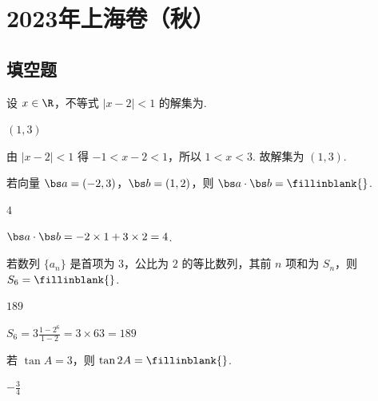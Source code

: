 ﻿\chapter{2023年上海卷（秋）}

\section{填空题}

\begin{problem}
设 \(x\in\R\)，不等式 \(\left|x-2\right|<1\) 的解集为\fillinblank{}.
\end{problem}

\begin{answer}
\(\left(1,3\right)\)
\end{answer}

\begin{solution}
由 \(\left|x-2\right|<1\) 得 \(-1<x-2<1\)，所以 \(1<x<3\). 故解集为 \(\left(1,3\right)\).
\end{solution}

\begin{problem}
若向量 \(\bs a=\left(-2,3\right)\)，\(\bs b=\left(1,2\right)\)，则 \(\bs a\cdot\bs b=\fillinblank{}\).
\end{problem}

\begin{answer}
\(4\)
\end{answer}

\begin{solution}
\(\bs a\cdot\bs b=-2\times 1+3\times 2=4\).
\end{solution}

\begin{problem}
若数列 \(\{a_n\}\) 是首项为 \(3\)，公比为 \(2\) 的等比数列，其前 \(n\) 项和为 \(S_n\)，则 \(S_6=\fillinblank{}\).
\end{problem}

\begin{answer}
\(189\)
\end{answer}

\begin{solution}
\(S_6=3\frac{1-2^6}{1-2}=3\times 63=189\)
\end{solution}

\begin{problem}
若 \(\tan A=3\)，则 \(\tan 2A=\fillinblank{}\).
\end{problem}

\begin{answer}
\(-\frac34\)
\end{answer}

